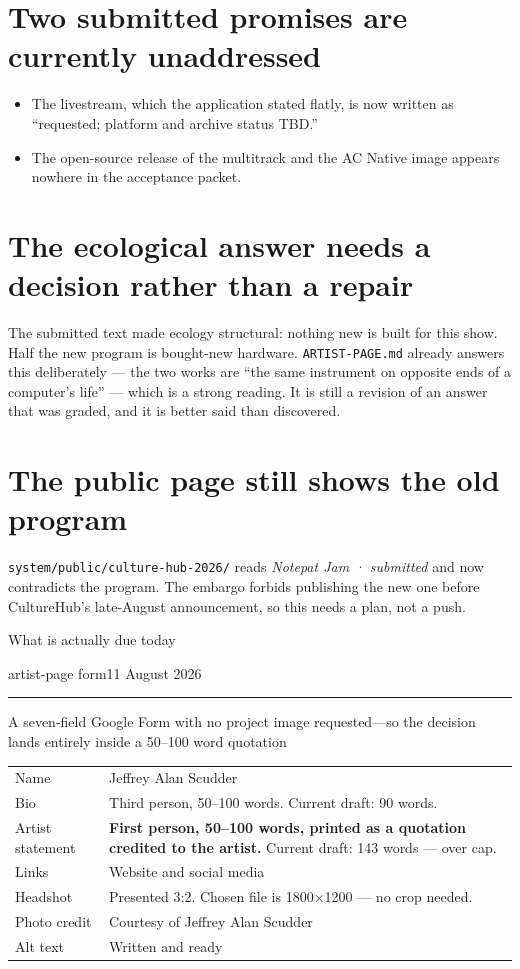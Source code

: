 \documentclass[10pt,letterpaper]{article}
\newcommand{\dsep}{{\normalfont\;\textperiodcentered\;}}
\newcommand{\dto}{{\normalfont--}}
\newcommand{\ddash}{{\normalfont\;---\;}}
\renewcommand{\packettitle}[2]{%
  {\acbold\fontsize{22pt}{24pt}\selectfont\color{acdark}#1\par}%
  \vspace{0.10em}%
  {\hyphenpenalty=10000\exhyphenpenalty=10000\RaggedRight
   \aclight\fontsize{11.5pt}{13.5pt}\selectfont\color{acpink}#2\par}%
  \vspace{0.22em}\color{acpink}\rule{\linewidth}{1pt}\color{black}\vspace{0.14em}%
}
\renewcommand{\pageclaim}[1]{%
  {\hyphenpenalty=10000\exhyphenpenalty=10000\RaggedRight
   \aclight\fontsize{12.5pt}{15pt}\selectfont\color{acpink}#1\par}\vspace{0.18em}}
\begin{document}
\section{Two submitted promises are currently unaddressed}
\begin{itemize}
\item The livestream, which the application stated flatly, is now written as
``requested; platform and archive status TBD.''
\item The open-source release of the multitrack and the AC Native image appears
nowhere in the acceptance packet.
\end{itemize}

\section{The ecological answer needs a decision rather than a repair}
The submitted text made ecology structural: nothing new is built for this show.
Half the new program is bought-new hardware. \texttt{ARTIST-PAGE.md} already
answers this deliberately — the two works are ``the same instrument on opposite
ends of a computer's life'' — which is a strong reading. It is still a revision
of an answer that was graded, and it is better said than discovered.

\section{The public page still shows the old program}
\texttt{system/public/culture-hub-2026/} reads \emph{Notepat Jam · submitted} and
now contradicts the program. The embargo forbids publishing the new one before
CultureHub's late-August announcement, so this needs a plan, not a push.

\clearpage
\packettitle{What is actually due today}{artist-page form\dsep 11 August 2026}

\pageclaim{A seven-field Google Form with no project image requested\ddash so
the decision lands entirely inside a 50\dto100 word quotation}

{\tighttable
\begin{tabularx}{\linewidth}{L{1.62in} Y}
\toprule
Name & Jeffrey Alan Scudder \\
Bio & Third person, 50–100 words. Current draft: 90 words. \\
Artist statement & \textbf{First person, 50–100 words, printed as a quotation credited to the artist.} Current draft: 143 words — over cap. \\
Links & Website and social media \\
Headshot & Presented 3:2. Chosen file is 1800×1200 — no crop needed. \\
Photo credit & Courtesy of Jeffrey Alan Scudder \\
Alt text & Written and ready \\
\bottomrule
\end{tabularx}}
\end{document}
